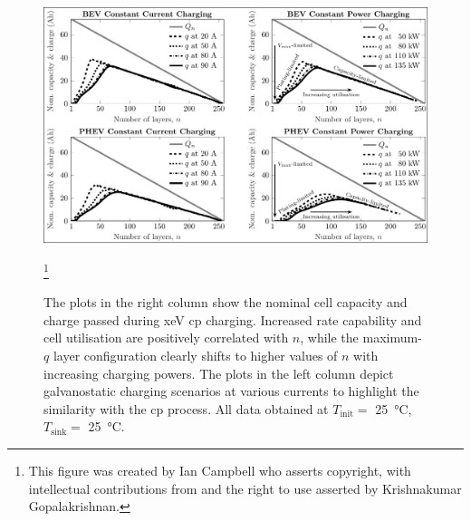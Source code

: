 \begin{figure}[!ht]
    \begin{minipage}[t]{\textwidth}
        \centering \includegraphics[width=\textwidth,trim=4 2 3 4,clip]{fig_capacity_quadrants.pdf}
        \caption[The plots  in the right  column show the nominal  cell capacity and  charge passed
        during \gls{xeV} \gls{cp} charging. Increased rate capability and cell utilisation are positively
        correlated with  $n$, while the  maximum-$q$ layer  configuration clearly shifts  to higher
        values  of $n$  with  increasing charging  powers.  The  plots in  the  left column  depict
        galvanostatic charging scenarios  at various currents to highlight the  similarity with the
        \gls{cp}  process.  All  data  obtained  at  $T_\text{init}  =$  \SI{25}{\degreeCelsius},
        $T_\text{sink} =$ \SI{25}{\degreeCelsius}.]{The plots  in the right  column show the nominal  cell capacity and  charge passed
            during \gls{xeV} \gls{cp} charging. Increased rate capability and cell utilisation are positively
            correlated with  $n$, while the  maximum-$q$ layer  configuration clearly shifts  to higher
            values  of $n$  with  increasing charging  powers.  The  plots in  the  left column  depict
            galvanostatic charging scenarios  at various currents to highlight the  similarity with the
            \gls{cp}  process.  All  data  obtained  at  $T_\text{init}  =$  \SI{25}{\degreeCelsius},
        $T_\text{sink} =$ \SI{25}{\degreeCelsius}\footnotemark.}\label{fig:fig_CapacityQuadrants}
        \mpfootnotes[1]
        \footnote{This figure was created by Ian Campbell who asserts copyright,
            with  intellectual  contributions  from  and   the  right  to  use  asserted  by
        Krishnakumar Gopalakrishnan.}
    \end{minipage}
\end{figure}

